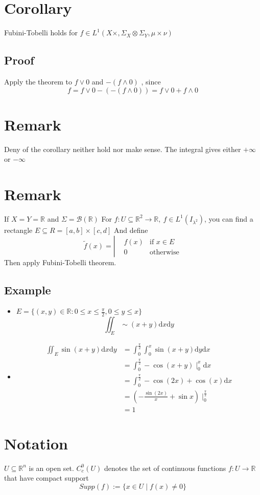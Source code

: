 \documentclass{book}
\begin{document}
\section{Corollary}
Fubini-Tobelli holds for $f\in L^1(X\times ,\Sigma_X\otimes \Sigma_Y,\mu\times\nu)$
\subsection{Proof}
Apply the theorem to $f\vee 0$ and $-(f\wedge 0)$ , since $$f=f\vee 0-(-(f\wedge 0))=f\vee0+f\wedge0$$
\section{Remark}
Deny of the corollary neither hold nor make sense. The integral gives either $+\infty$ or $-\infty$
\section{Remark}
If $X=Y=\mathbb{R}$ and $\Sigma=\mathscr{B}(\mathbb{R})$ For $f:U\subseteq \mathbb{R}^2\rightarrow \mathbb{R},\ f\in L^1(I_{\lambda^2})$, you can find a rectangle $E\subseteq R=[a,b]\times[c,d]$ And define
$$\tilde{f}(x)=\left|\begin{aligned}
    &f(x) &\text{if }x\in E\\
    &0 &\text{otherwise}
\end{aligned}\right.$$
Then apply Fubini-Tobelli theorem.
\subsection*{Example}
\begin{itemize}
    \item$E=\{(x,y)\in \mathbb{R}:0\leq x\leq\frac{\pi}2,0\leq y\leq x\}$
    $$\iint_E\sim(x+y)\text{d}x\text{d}y$$
    \item
    $$\begin{aligned}
        \iint_E\sin(x+y)\text{d}x\text{d}y &=\int_0^{\frac{\pi}2}\int_0^x\sin(x+y)\text{d}y\text{d}x\\
        &=\int_0^{\frac{\pi}2}-\cos(x+y)\mid_0^x\text{d}x\\
        &=\int_0^{\frac{\pi}2}-\cos(2x)+\cos(x)\text{d}x\\
        &=(-\frac{\sin(2x)}x+\sin x)\mid_0^{\frac{\pi}2}\\
        &=1
    \end{aligned}$$
\end{itemize}
\section{Notation}
$U\subseteq\mathbb{R}^n$ is an open set. $C^0_c(U)$ denotes the set of continuous functions $f:U\rightarrow\mathbb{R}$ that have compact support $$Supp(f):=\{x\in U\mid f(x)\neq 0\}$$
\end{document}
